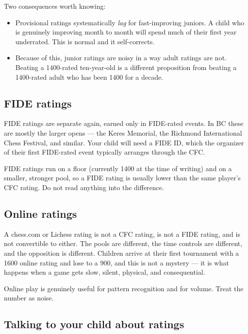 \documentclass[10pt,letterpaper]{article}
\begin{document}
Two consequences worth knowing:

\begin{itemize}
  \item Provisional ratings systematically \emph{lag} for fast-improving
        juniors. A child who is genuinely improving month to month will spend
        much of their first year underrated. This is normal and it self-corrects.
  \item Because of this, junior ratings are noisy in a way adult ratings are not.
        Beating a 1400-rated ten-year-old is a different proposition from
        beating a 1400-rated adult who has been 1400 for a decade.
\end{itemize}

\subsection{FIDE ratings}

FIDE ratings are separate again, earned only in FIDE-rated events. In BC these
are mostly the larger opens --- the Keres Memorial, the Richmond International
Chess Festival, and similar. Your child will need a FIDE ID, which the organizer
of their first FIDE-rated event typically arranges through the CFC.

FIDE ratings run on a floor (currently 1400 at the time of writing) and on a
smaller, stronger pool, so a FIDE rating is usually lower than the same player's
CFC rating. Do not read anything into the difference.

\subsection{Online ratings}

A chess.com or Lichess rating is not a CFC rating, is not a FIDE rating, and is
not convertible to either. The pools are different, the time controls are
different, and the opposition is different. Children arrive at their first
tournament with a 1600 online rating and lose to a 900, and this is not a
mystery --- it is what happens when a game gets slow, silent, physical, and
consequential.

Online play is genuinely useful for pattern recognition and for volume. Treat
the number as noise.

\subsection{Talking to your child about ratings}
\end{document}
